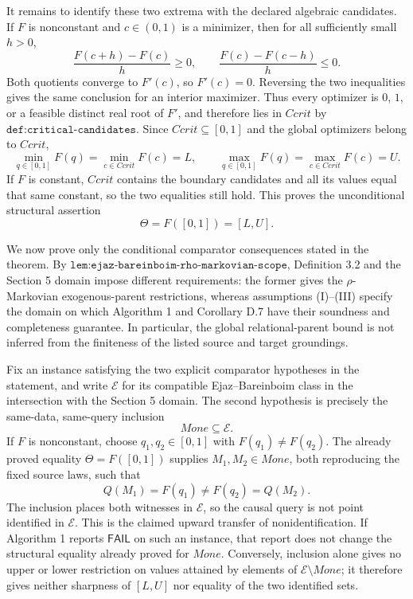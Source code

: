 It remains to identify these two extrema with the declared algebraic
candidates.  If \(F\) is nonconstant and \(c\in(0,1)\) is a minimizer,
then for all sufficiently small \(h>0\),
\[
 \frac{F(c+h)-F(c)}{h}\geq0,
 \qquad
 \frac{F(c)-F(c-h)}{h}\leq0.
\]
Both quotients converge to \(F'(c)\), so \(F'(c)=0\).  Reversing the two
inequalities gives the same conclusion for an interior maximizer.  Thus
every optimizer is \(0\), \(1\), or a feasible distinct real root of
\(F'\), and therefore lies in \(Ccrit\) by
\(\texttt{def:critical-candidates}\).  Since \(Ccrit\subseteq[0,1]\) and
the global optimizers belong to \(Ccrit\),
\[
 \min_{q\in[0,1]}F(q)=\min_{c\in Ccrit}F(c)=L,
 \qquad
 \max_{q\in[0,1]}F(q)=\max_{c\in Ccrit}F(c)=U.
\]
If \(F\) is constant, \(Ccrit\) contains the boundary candidates and all
its values equal that same constant, so the two equalities still hold.
This proves the unconditional structural assertion
\[
 \Theta=F([0,1])=[L,U].
\]

We now prove only the conditional comparator consequences stated in the
theorem.  By
\(\texttt{lem:ejaz-bareinboim-rho-markovian-scope}\), Definition 3.2 and
the Section 5 domain impose different requirements: the former gives the
\(\rho\)-Markovian exogenous-parent restrictions, whereas assumptions
(I)--(III) specify the domain on which Algorithm 1 and Corollary D.7 have
their soundness and completeness guarantee.  In particular, the global
relational-parent bound is not inferred from the finiteness of the listed
source and target groundings.

Fix an instance satisfying the two explicit comparator hypotheses in the
statement, and write \(\mathcal E\) for its compatible
Ejaz--Bareinboim class in the intersection with the Section 5 domain.
The second hypothesis is precisely the same-data, same-query inclusion
\[
 Mone\subseteq\mathcal E.
\]
If \(F\) is nonconstant, choose \(q_1,q_2\in[0,1]\) with
\(F(q_1)\neq F(q_2)\).  The already proved equality
\(\Theta=F([0,1])\) supplies \(M_1,M_2\in Mone\), both reproducing the
fixed source laws, such that
\[
 Q(M_1)=F(q_1)\neq F(q_2)=Q(M_2).
\]
The inclusion places both witnesses in \(\mathcal E\), so the causal query
is not point identified in \(\mathcal E\).  This is the claimed upward
transfer of nonidentification.  If Algorithm 1 reports
\(\mathsf{FAIL}\) on such an instance, that report does not change the
structural equality already proved for \(Mone\).  Conversely, inclusion
alone gives no upper or lower restriction on values attained by elements
of \(\mathcal E\setminus Mone\); it therefore gives neither sharpness of
\([L,U]\) nor equality of the two identified sets.


